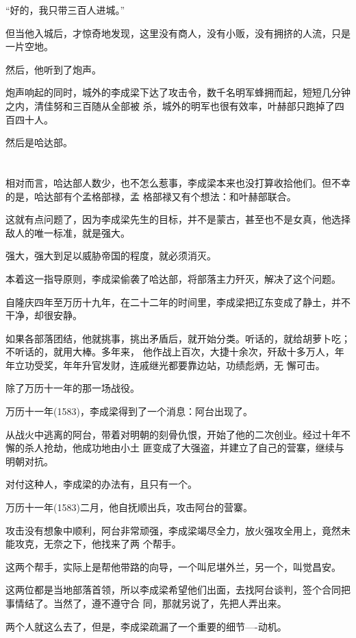\documentclass[11pt,a4paper,onecolumn]{article}
\begin{document}
``好的，我只带三百人进城。''

但当他入城后，才惊奇地发现，这里没有商人，没有小贩，没有拥挤的人流，只是一片空地。

然后，他听到了炮声。

炮声响起的同时，城外的李成梁下达了攻击令，数千名明军蜂拥而起，短短几分钟之内，清佳努和三百随从全部被
杀，城外的明军也很有效率，叶赫部只跑掉了四百四十人。

然后是哈达部。

\section[\thesection]{}

相对而言，哈达部人数少，也不怎么惹事，李成梁本来也没打算收拾他们。但不幸的是，哈达部有个孟格部禄，孟
格部禄又有个想法：和叶赫部联合。

这就有点问题了，因为李成梁先生的目标，并不是蒙古，甚至也不是女真，他选择敌人的唯一标准，就是强大。

强大，强大到足以威胁帝国的程度，就必须消灭。

本着这一指导原则，李成梁偷袭了哈达部，将部落主力歼灭，解决了这个问题。

自隆庆四年至万历十九年，在二十二年的时间里，李成梁把辽东变成了静土，并不干净，却很安静。

如果各部落团结，他就挑事，挑出矛盾后，就开始分类。听话的，就给胡萝卜吃；不听话的，就用大棒。多年来，
他作战上百次，大捷十余次，歼敌十多万人，年年立功受奖，年年升官发财，连戚继光都要靠边站，功绩彪炳，无
懈可击。

除了万历十一年的那一场战役。

万历十一年(1583)，李成梁得到了一个消息：阿台出现了。

从战火中逃离的阿台，带着对明朝的刻骨仇恨，开始了他的二次创业。经过十年不懈的杀人抢劫，他成功地由小土
匪变成了大强盗，并建立了自己的营寨，继续与明朝对抗。

对付这种人，李成梁的办法有，且只有一个。

万历十一年(1583)二月，他自抚顺出兵，攻击阿台的营寨。

攻击没有想象中顺利，阿台非常顽强，李成梁竭尽全力，放火强攻全用上，竟然未能攻克，无奈之下，他找来了两
个帮手。

这两个帮手，实际上是帮他带路的向导，一个叫尼堪外兰，另一个，叫觉昌安。

这两位都是当地部落首领，所以李成梁希望他们出面，去找阿台谈判，签个合同把事情结了。当然了，遵不遵守合
同，那就另说了，先把人弄出来。

两个人就这么去了，但是，李成梁疏漏了一个重要的细节----动机。
\end{document}
